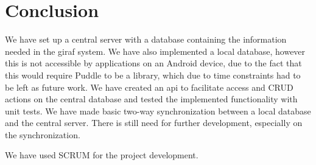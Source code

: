 \section{Conclusion}
We have set up a central server with a database containing the information needed in the \ac{giraf} system. We have also implemented a local database, however this is not accessible by applications on an Android device, due to the fact that this would require Puddle to be a library, which due to time constraints had to be left as future work. We have created an \ac{api} to facilitate access and CRUD actions on the central database and tested the implemented functionality with unit tests. We have made basic two-way synchronization between a local database and the central server. There is still need for further development, especially on the synchronization.

We have used SCRUM for the project development. 